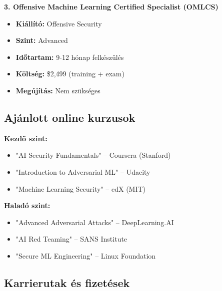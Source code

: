 \documentclass{../templates/magazine}
\begin{document}
\textbf{3. Offensive Machine Learning Certified Specialist (OMLCS)}
\begin{itemize}
    \item \textbf{Kiállító:} Offensive Security
    \item \textbf{Szint:} Advanced
    \item \textbf{Időtartam:} 9-12 hónap felkészülés
    \item \textbf{Költség:} \$2,499 (training + exam)
    \item \textbf{Megújítás:} Nem szükséges
\end{itemize}

\subsection{Ajánlott online kurzusok}

\textbf{Kezdő szint:}
\begin{itemize}
    \item "AI Security Fundamentals" -- Coursera (Stanford)
    \item "Introduction to Adversarial ML" -- Udacity
    \item "Machine Learning Security" -- edX (MIT)
\end{itemize}

\textbf{Haladó szint:}
\begin{itemize}
    \item "Advanced Adversarial Attacks" -- DeepLearning.AI
    \item "AI Red Teaming" -- SANS Institute
    \item "Secure ML Engineering" -- Linux Foundation
\end{itemize}

\subsection{Karrierutak és fizetések}
\end{document}
